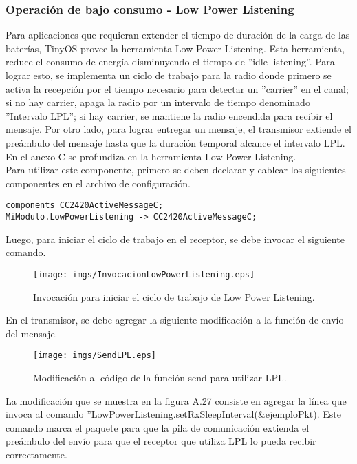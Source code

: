 \subsubsection{Operación de bajo consumo - Low Power Listening}
Para aplicaciones que requieran extender el tiempo de duración de la carga de las baterías, TinyOS provee la herramienta Low Power Listening. Esta herramienta, reduce el consumo de energía disminuyendo el tiempo de ''idle listening''. Para lograr esto, se implementa un ciclo de trabajo para la radio donde primero se activa la recepción por el tiempo necesario para detectar un ''carrier'' en el canal; si no hay carrier, apaga la radio por un intervalo de tiempo denominado ''Intervalo LPL''; si hay carrier, se mantiene la radio encendida para recibir el mensaje. Por otro lado, para lograr entregar un mensaje, el transmisor extiende el preámbulo del mensaje hasta que la duración temporal alcance el intervalo LPL. En el anexo C se profundiza en la herramienta Low Power Listening.\\

Para utilizar este componente, primero se deben declarar y cablear los siguientes componentes en el archivo de configuración.

\begin{verbatim}
components CC2420ActiveMessageC;
MiModulo.LowPowerListening -> CC2420ActiveMessageC;
\end{verbatim}

Luego, para iniciar el ciclo de trabajo en el receptor, se debe invocar el siguiente comando.
\begin{center}
\begin{figure}[H]
\centering
\texttt{[image: imgs/InvocacionLowPowerListening.eps]} 
\caption{Invocación para iniciar el ciclo de trabajo de Low Power Listening.}
\end{figure}
\end{center}

En el transmisor, se debe agregar la siguiente modificación a la función de envío del mensaje.

\begin{center}
\begin{figure}[H]
\centering
\texttt{[image: imgs/SendLPL.eps]} 
\caption{Modificación al código de la función send para utilizar LPL.}
\end{figure}
\end{center}

La modificación que se muestra en la figura A.27 consiste en agregar la línea que invoca al comando ''LowPowerListening.setRxSleepInterval(\&ejemploPkt). Este comando marca el paquete para que la pila de comunicación extienda el preámbulo del envío para que el receptor que utiliza LPL lo pueda recibir correctamente.\\

